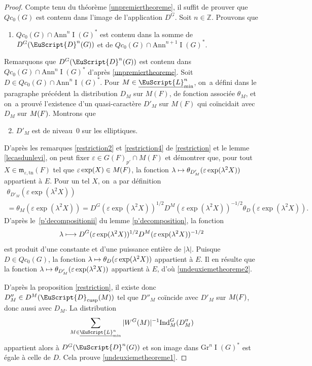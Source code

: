\documentclass[JEP,XML,SOM,Unicode,francais]{cedram}
\let\mathcal \EuScript
\newcommand{\NoChangel}[1]{%
\expandafter\let\csname old\string#1\endcsname=#1
\let#1=\relax
\newcommand{#1}{\mathcode`l="716C\csname old\string#1\endcsname\mathcode`l="7160 }%
}
\let\epsilon\varepsilon
\newcommand\mto{\mathchoice{\longmapsto}{\mapsto}{\mapsto}{\mapsto}}
\newcommand{\mfrm}{\mathfrak{m}}
\newcommand{\Ann}{\mathrm{Ann}}
\newcommand{\cusp}{\mathrm{cusp}}
\newcommand{\rell}{\mathrm{ell}} \NoChangel{\rell}
\newcommand{\Gr}{\mathrm{Gr}}
\newcommand{\Ind}{\mathrm{Ind}}
\newcommand{\tn}{\mathrm{tn}}
\DeclareMathOperator{\rI}{I}
\newcommand{\cD}{\mathcal{D}}
\newcommand{\cL}{\mathcal{L}}
\newcommand{\ZZ}{\mathbb{Z}}
\theoremstyle{plain}
\theoremstyle{definition}
\begin{document}
\begin{proof}
Compte tenu du théorème \ref{unpremiertheoreme}, il suffit de prouver que $Qc_{0}(G)$ est contenu dans l'image de l'application $D^G$. Soit $n\in \ZZ$. Prouvons que
\begin{enumerate}
\item\label{undeuxiemetheoreme1}
$Qc_{0}(G)\cap \Ann^n\rI(G)^*$ est contenu dans la somme de $D^G(\cD^n(G))$ et de $Qc_{0}(G)\cap \Ann^{n+1}\rI(G)^*$.
\end{enumerate}

Remarquons que $D^G(\cD^n(G))$ est contenu dans $Qc_{0}(G)\cap \Ann^n\rI(G)^*$ d'après \ref{unpremiertheoreme}. Soit $D\in Qc_{0}(G)\cap \Ann^n\rI(G)^*$. Pour $M\in \underline{\cL}_{\min}^n$, on~a défini dans le paragraphe précédent la distribution $D_{M}$ sur $M(F)$, de fonction associée $\theta_{M}$, et on~a prouvé l'existence d'un quasi-caractère $D'_{M}$ sur $M(F)$ qui coïncidait avec $D_{M}$ sur $M_{\rell}(F)$. Montrons que
\begin{enumerate}\setcounter{enumi}{1}
\item\label{undeuxiemetheoreme2}
$D'_{M}$ est de niveau~$0$ sur les elliptiques.
\end{enumerate}

D'après les remarques \eqref{restriction2} et \eqref{restriction4} de \ref{restriction} et le lemme \ref{lecasdunlevi}, on peut fixer $\epsilon\in G(F)_{p'}\cap M(F)$ et démontrer que, pour tout $X\in \mfrm_{\epsilon,\tn}(F)$ tel que $\epsilon \exp(X)\in M_{\rell}(F)$, la fonction $\lambda\mto \theta_{D'_{M}}(\epsilon \exp(\lambda^2X))$ appartient à $E$. Pour un tel $X$, on~a par définition
\begin{multline*}
\theta_{D'_{M}}(\epsilon \exp(\lambda^2X))\\
=\theta_{M}(\epsilon \exp(\lambda^2X))=D^G(\epsilon \exp(\lambda^2X))^{1/2}D^M(\epsilon \exp(\lambda^2X))^{-1/2}\theta_{D}(\epsilon \exp(\lambda^2X)).
\end{multline*}
D'après le~\eqref{p'decompositionii} du lemme \ref{p'decomposition}, la fonction
\[
\lambda\mto D^G(\epsilon \exp(\lambda^2X))^{1/2}D^M(\epsilon \exp(\lambda^2X))^{-1/2}
\]
est produit d'une constante et d'une puissance entière de $\vert \lambda\vert $. Puisque $D\in Qc_{0}(G)$, la fonction $\lambda\mto \theta_{D}(\epsilon \exp(\lambda^2X))$ appartient à $E$. Il en résulte que la fonction $\lambda\mto \theta_{D'_{M}}(\epsilon \exp(\lambda^2X))$ appartient à $E$, d'où \eqref{undeuxiemetheoreme2}.

D'après la proposition \ref{restriction}, il existe donc $D''_{M}\in D^M(\cD_{\cusp}(M))$ tel que $D''_{M}$ coïncide avec $D'_{M}$ sur $M_{\rell}(F)$, donc aussi avec $D_{M}$. La distribution
\[
\sum_{M\in \underline{\cL}_{\min}^n} \vert W^G(M)\vert ^{-1}\Ind_{M}^G(D''_{M})
\]
appartient alors à $D^G(\cD^n(G))$ et son image dans $\Gr^n\rI(G)^*$ est égale à celle de $D$. Cela prouve \eqref{undeuxiemetheoreme1}.


\end{proof}
\end{document}
